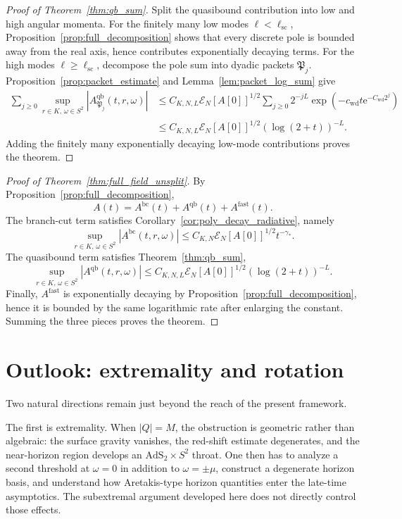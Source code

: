 \documentclass[12pt]{article}
\numberwithin{equation}{section}
\theoremstyle{plain}
\theoremstyle{definition}
\theoremstyle{remark}
\newcommand{\ee}{\mathrm e}
\newcommand{\bc}{\mathrm{bc}}
\newcommand{\qb}{\mathrm{qb}}
\newcommand{\fast}{\mathrm{fast}}
\newcommand{\abs}[1]{\left|#1\right|}
\begin{document}
\begin{proof}[Proof of Theorem~\ref{thm:qb_sum}]
Split the quasibound contribution into low and high angular momenta.  For the finitely many low modes $\ell<\ell_{\mathrm{sc}}$, Proposition~\ref{prop:full_decomposition} shows that every discrete pole is bounded away from the real axis, hence contributes exponentially decaying terms.  For the high modes $\ell\ge\ell_{\mathrm{sc}}$, decompose the pole sum into dyadic packets $\mathfrak P_j$.  Proposition~\ref{prop:packet_estimate} and Lemma~\ref{lem:packet_log_sum} give
\begin{align*}
   \sum_{j\ge0}
   \sup_{r\in K,\,\omega\in S^2}\abs{A^{\qb}_{\mathfrak P_j}(t,r,\omega)}
   &\le
   C_{K,N,L}\mathcal E_N[A[0]]^{1/2}
   \sum_{j\ge0}2^{-jL}\exp(-c_{\mathrm{wd}}t\ee^{-C_{\mathrm{wd}}2^j})
   \\
   &\le
   C_{K,N,L}\mathcal E_N[A[0]]^{1/2}(\log(2+t))^{-L}.
\end{align*}
Adding the finitely many exponentially decaying low-mode contributions proves the theorem.
\end{proof}

\begin{proof}[Proof of Theorem~\ref{thm:full_field_unsplit}]
By Proposition~\ref{prop:full_decomposition},
\[
   A(t)=A^{\bc}(t)+A^{\qb}(t)+A^{\fast}(t).
\]
The branch-cut term satisfies Corollary~\ref{cor:poly_decay_radiative}, namely
\[
   \sup_{r\in K,\,\omega\in S^2}\abs{A^{\bc}(t,r,\omega)}
   \le
   C_{K,N}\mathcal E_N[A[0]]^{1/2}t^{-\gamma_*}.
\]
The quasibound term satisfies Theorem~\ref{thm:qb_sum},
\[
   \sup_{r\in K,\,\omega\in S^2}\abs{A^{\qb}(t,r,\omega)}
   \le
   C_{K,N,L}\mathcal E_N[A[0]]^{1/2}(\log(2+t))^{-L}.
\]
Finally, $A^{\fast}$ is exponentially decaying by Proposition~\ref{prop:full_decomposition}, hence it is bounded by the same logarithmic rate after enlarging the constant.  Summing the three pieces proves the theorem.
\end{proof}


\section{Outlook: extremality and rotation}\label{sec:future}

Two natural directions remain just beyond the reach of the present framework.

The first is extremality.  When $\abs{Q}=M$, the obstruction is geometric rather than algebraic: the surface gravity vanishes, the red-shift estimate degenerates, and the near-horizon region develops an $\mathrm{AdS}_2\times S^2$ throat.  One then has to analyze a second threshold at $\omega=0$ in addition to $\omega=\pm\mu$, construct a degenerate horizon basis, and understand how Aretakis-type horizon quantities enter the late-time asymptotics.  The subextremal argument developed here does not directly control those effects.
\end{document}
